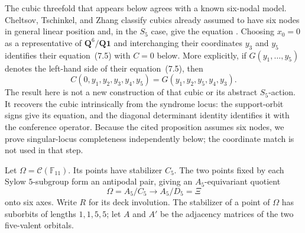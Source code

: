 \documentclass[11pt]{article}
\theoremstyle{definition}
\theoremstyle{remark}
\newcommand{\F}{\mathbb{F}}
\newcommand{\cC}{\mathcal{C}}
\begin{document}
The cubic threefold that appears below agrees with a known six-nodal model.
Cheltsov, Tschinkel, and Zhang classify cubics already assumed to have six
nodes in general linear position and, in the $S_5$ case, give the equation
\cite[\S7, equations~(7.4)--(7.5), Proposition~7.3]{CTZ2025}.
Choosing $x_0=0$ as a representative of
$\mathbf Q^6/\mathbf Q\mathbf1$ and interchanging their coordinates
$y_3$ and $y_5$ identifies their equation~(7.5) with $C=0$ below.
More explicitly, if $G(y_1,\ldots,y_5)$ denotes the left-hand side of
their equation~(7.5), then
\[
 C(0,y_1,y_2,y_3,y_4,y_5)
 =G(y_1,y_2,y_5,y_4,y_3).
\]
The result here is not a new construction of that cubic or its abstract
$S_5$-action.  It recovers the cubic intrinsically from the syndrome
locus: the support-orbit signs give its equation, and the diagonal
determinant identity identifies it with the conference operator.
Because the cited proposition assumes six nodes, we prove singular-locus
completeness independently below; the coordinate match is not used in that
step.

Let $\Omega=\cC(\F_{11})$.  Its points have stabilizer $C_5$.  The two
points fixed by each Sylow $5$-subgroup form an antipodal pair, giving an
$A_5$-equivariant quotient
\[
 \Omega=A_5/C_5\longrightarrow A_5/D_5=\Xi
\]
onto six axes.  Write $R$ for its deck involution.  The stabilizer of a
point of $\Omega$ has suborbits of lengths $1,1,5,5$; let $A$ and $A'$
be the adjacency matrices of the two five-valent orbitals.
\end{document}
